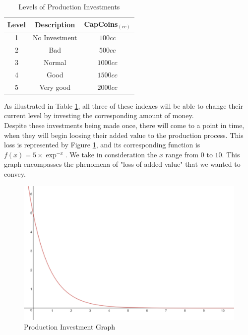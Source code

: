 \begin{table}[ht]
\centering
\begin{tabular}{c|c|c}
\hline
 Level & Description & CapCoins$_{(cc)}$\\
\hline \hline
 1 & No Investment & $100cc$ \\
 2 & Bad & $ 500cc$\\
 3 & Normal & $1000cc$ \\
 4 & Good & $1500cc$ \\
 5 & Very good & $2000cc$\\
\hline
\end{tabular}
\caption{Levels of Production Investments}
\label{table:prod-investments}
\end{table}
As illustrated in Table \ref{table:prod-investments}, all three of these indexes will be able to change their current level by investing the corresponding amount of money.\\
Despite these investments being made once, there will come to a point in time, when they will begin loosing their added value to the production process. This loss is represented by Figure \ref{fig:InvestmentGraph}, and its corresponding function is $f(x)=5\times\exp^{-x}$. We take in consideration the $x$ range from $0$ to $10$. This graph encompasses the phenomena of "loss of added value" that we wanted to convey.

\begin{figure}[ht]
	\centering
		\includegraphics[scale=0.35]{images/InvestmentGraph.pdf}
	\caption{Production Investment Graph}
	\label{fig:InvestmentGraph}
\end{figure}

